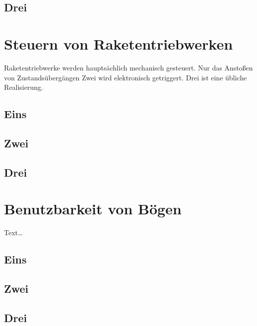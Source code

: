 \documentclass[11pt,a4paper]{report}
\begin{document}
    \section{Drei}

    \blindtext[1]

    \chapter{Steuern von Raketentriebwerken} \label{ch:rocket}

    Raketentriebwerke werden hauptsächlich mechanisch gesteuert.
    Nur das Anstoßen von Zustandsübergängen Zwei wird elektronisch
    getriggert.
    Drei ist eine übliche Realisierung.

    \section{Eins}

    \blindtext[1]

    \section{Zwei}

    \blindtext[1]

    \section{Drei}

    \blindtext[1]

    \chapter{Benutzbarkeit von Bögen} \label{chap:bow}

    Text\ldots

    \section{Eins}

    \blindtext[1]

    \section{Zwei}

    \blindtext[1]

    \section{Drei}
\end{document}
